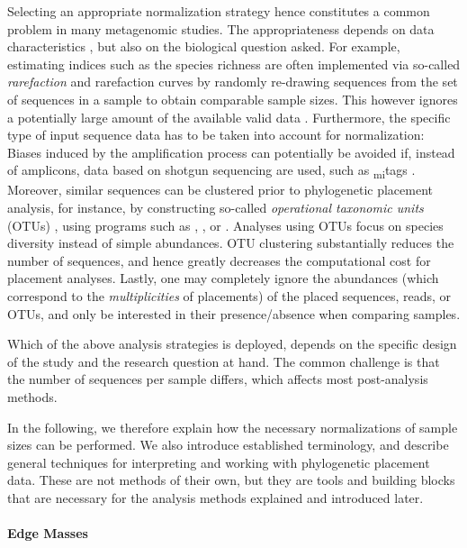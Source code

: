 Selecting an appropriate normalization strategy hence constitutes a common problem in many metagenomic studies.
The appropriateness depends on data characteristics \cite{Weiss2017}, but also on the biological question asked.
For example, estimating indices such as the species richness are often implemented
via so-called \emph{rarefaction} and rarefaction curves \cite{Gotelli2001}
by randomly re-drawing sequences from the set of sequences in a sample to obtain comparable sample sizes.
This however ignores a potentially large amount of the available valid data \cite{McMurdie2014}.
Furthermore, the specific type of input sequence data has to be taken into account for normalization:
Biases induced by the amplification process can potentially be avoided if, instead of amplicons,
data based on shotgun sequencing are used, such as \textsubscript{mi}tags \cite{Logares2014}.
Moreover, similar sequences can be clustered prior to phylogenetic placement analysis, for instance,
by constructing so-called \emph{operational taxonomic units} (OTUs) \cite{Sokal1963,Blaxter2005},
using programs such as  \cite{Edgar2010},
 \cite{Rognes2016}, or  \cite{Mahe2014,Mahe2015}.
Analyses using OTUs focus on species diversity instead of simple abundances.
OTU clustering substantially reduces the number of sequences,
and hence greatly decreases the computational cost for placement analyses.
Lastly, one may completely ignore the abundances (which correspond to the \emph{multiplicities} of placements)
of the placed sequences, reads, or OTUs, and only be interested in their presence/absence when comparing samples.

Which of the above analysis strategies is deployed,
depends on the specific design of the study and the research question at hand.
The common challenge is that the number of sequences per sample differs, which affects most post-analysis methods.

In the following, we therefore explain how the necessary normalizations of sample sizes can be performed.
We also introduce established terminology,
and describe general techniques for interpreting and working with phylogenetic placement data.
These are not methods of their own, but they are tools and building blocks
that are necessary for the analysis methods explained and introduced later.

\paragraph{Edge Masses}
\label{ch:Foundations:sec:PhylogeneticPlacement:sub:PlacementProcessing:par:EdgeMasses}

